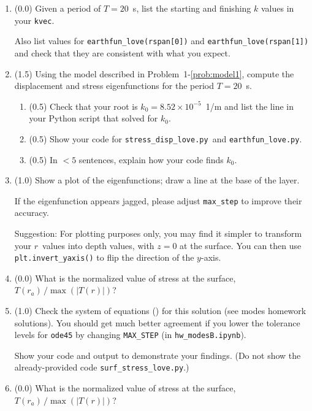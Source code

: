 \documentclass[11pt,titlepage,fleqn]{article}
\newcommand{\tfileAA}{{\tt hw\_modesB.ipynb}}
\newcommand{\tfileBB}{{\tt surf\_stress\_love.py}}
\newcommand{\tfileCC}{{\tt stress\_disp\_love.py}}
\newcommand{\tfileDD}{{\tt earthfun\_love.py}}
\begin{document}
\begin{enumerate}
\begin{enumerate}
\item (0.0) Given a period of $T = 20$~s, list the starting and finishing $k$ values in your \verb+kvec+.

Also list values for \verb+earthfun_love(rspan[0])+ and \verb+earthfun_love(rspan[1])+ and check that they are consistent with what you expect.

\item (1.5) Using the model described in Problem~1-\ref{prob:model1}, compute the displacement and stress eigenfunctions for the period $T = 20$~s.

\begin{enumerate}
\item (0.5) Check that your root is $k_0 = 8.52 \times 10^{-5}$~1/m and list the line in your Python script that solved for $k_0$.

\item (0.5) Show your code for \tfileCC\ and \tfileDD.

\item (0.5) In $<5$ sentences, explain how your code finds $k_0$.

\end{enumerate}

\item (1.0) Show a plot of the eigenfunctions; draw a line at the base of the layer.

If the eigenfunction appears jagged, please adjust \verb+max_step+ to improve their accuracy.

Suggestion: For plotting purposes only, you may find it simpler to transform your $r$~values into depth values, with $z=0$ at the surface. You can then use \\ \verb+plt.invert_yaxis()+ to flip the direction of the $y$-axis.

\item (0.0) What is the normalized value of stress at the surface, $T(r_a)\,/\max(|T(r)|)$?

\item (1.0) Check the system of equations () for this solution (see modes homework solutions). You should get much better agreement if you lower the tolerance levels for \verb+ode45+ by changing \verb+MAX_STEP+ (in \tfileAA).

Show your code and output to demonstrate your findings.
(Do not show the already-provided code \tfileBB.)

\item (0.0) What is the normalized value of stress at the surface, $T(r_a)\,/\max(|T(r)|)$?


\end{enumerate}
\end{enumerate}
\end{document}
